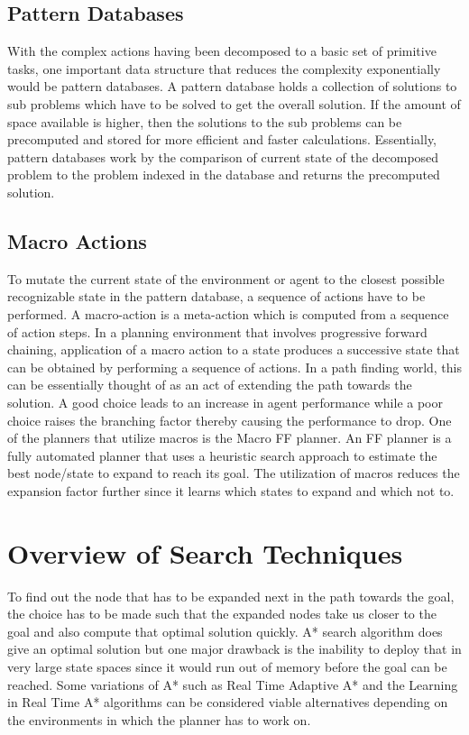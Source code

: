 \documentclass[tog]{acmsiggraph}
\begin{document}
\subsection{Pattern Databases}

With the complex actions having been decomposed to a basic set of
primitive tasks, one important data structure that reduces the
complexity exponentially would be pattern databases. A pattern
database holds a collection of solutions to sub problems which have to
be solved to get the overall solution. If the amount of space
available is higher, then the solutions to the sub problems can be
precomputed and stored for more efficient and faster calculations.
Essentially, pattern databases work by the comparison of current state
of the decomposed problem to the problem indexed in the database and
returns the precomputed solution.

\subsection{Macro Actions}

To mutate the current state of the environment or agent to the closest
possible recognizable state in the pattern database, a sequence of
actions have to be performed. A macro-action is a meta-action which is
computed from a sequence of action steps. In a planning environment
that involves progressive forward chaining, application of a macro
action to a state produces a successive state that can be obtained by
performing a sequence of actions. In a path finding world, this can be
essentially thought of as an act of extending the path towards the
solution. A good choice leads to an increase in agent performance
while a poor choice raises the branching factor thereby causing the
performance to drop. One of the planners that utilize macros is the
Macro FF planner. An FF planner is a fully automated planner that uses
a heuristic search approach to estimate the best node/state to expand
to reach its goal. The utilization of macros reduces the expansion
factor further since it learns which states to expand and which not
to.

\section{Overview of Search Techniques}


To find out the node that has to be expanded next in the path towards
the goal, the choice has to be made such that the expanded nodes take
us closer to the goal and also compute that optimal solution quickly.
A* search algorithm does give an optimal solution but one major
drawback is the inability to deploy that in very large state spaces
since it would run out of memory before the goal can be reached. Some
variations of A* such as Real Time Adaptive A* and the Learning in
Real Time A* algorithms can be considered viable alternatives
depending on the environments in which the planner has to work on.
\end{document}
